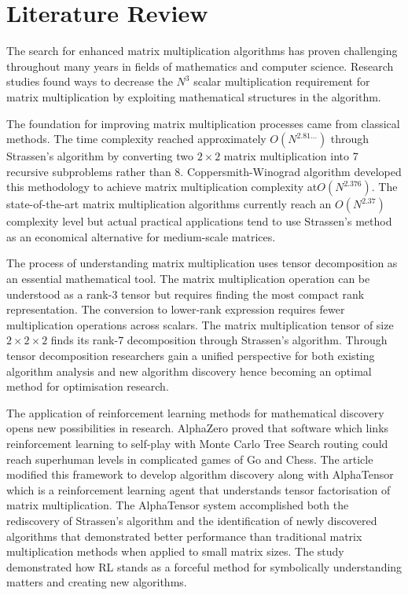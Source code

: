 \documentclass{article}
\begin{document}
\section{Literature Review}
The search for enhanced matrix multiplication algorithms has proven challenging throughout many years in fields of mathematics and computer science. Research studies found ways to decrease the \( N^3 \) scalar multiplication requirement for matrix multiplication by exploiting mathematical structures in the algorithm.

The foundation for improving matrix multiplication processes came from classical methods. The time complexity reached approximately \( O(N^{2.81...}) \) through Strassen's algorithm by converting two \( 2 \times 2 \) matrix multiplication into 7 recursive subproblems rather than 8. 
Coppersmith-Winograd algorithm developed this methodology to achieve matrix multiplication complexity at\(  O(N^{2.376}) \). The state-of-the-art matrix multiplication algorithms currently reach an \( O(N^{2.37}) \) complexity level but actual practical applications tend to use Strassen's method as an economical alternative for medium-scale matrices.

The process of understanding matrix multiplication uses tensor decomposition as an essential mathematical tool. The matrix multiplication operation can be understood as a rank-3 tensor but requires finding the most compact rank representation. The conversion to lower-rank expression requires fewer multiplication operations across scalars. The matrix multiplication tensor of size \( 2 \times 2 \times 2 \) finds its rank-7 decomposition through Strassen's algorithm. Through tensor decomposition researchers gain a unified perspective for both existing algorithm analysis and new algorithm discovery hence becoming an optimal method for optimisation research.

The application of reinforcement learning methods for mathematical discovery opens new possibilities in research. AlphaZero proved that software which links reinforcement learning to self-play with Monte Carlo Tree Search routing could reach superhuman levels in complicated games of Go and Chess. The article modified this framework to develop algorithm discovery along with AlphaTensor which is a reinforcement learning agent that understands tensor factorisation of matrix multiplication. The AlphaTensor system accomplished both the rediscovery of Strassen's algorithm and the identification of newly discovered algorithms that demonstrated better performance than traditional matrix multiplication methods when applied to small matrix sizes. 
The study demonstrated how RL stands as a forceful method for symbolically understanding matters and creating new algorithms.
\end{document}
